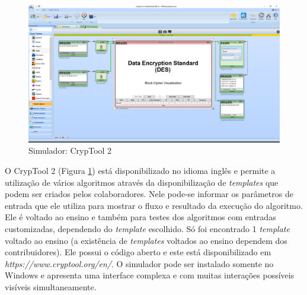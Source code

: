 \begin{figure}[H]
    \centering
    \caption{Simulador: CrypTool 2}
    \label{fig:cryptool2}
    \includegraphics[width=1\linewidth]{Simuladores/CrypTool2.png}
\end{figure}

O CrypTool 2 (Figura \ref{fig:cryptool2}) está disponibilizado no idioma inglês e permite a utilização de vários algoritmos através da disponibilização de \textit{templates} que podem ser criados pelos colaboradores. Nele pode-se informar os parâmetros de entrada que ele utiliza para mostrar o fluxo e resultado da execução do algoritmo. Ele é voltado ao ensino e também para testes dos algoritmos com entradas customizadas, dependendo do \textit{template} escolhido. Só foi encontrado 1 \textit{template} voltado ao ensino (a existência de \textit{templates} voltados ao ensino dependem dos contribuidores). Ele possui o código aberto e este está disponibilizado em \textit{https://www.cryptool.org/en/}. O simulador pode ser instalado somente no Windows e apresenta uma interface complexa e com muitas interações possíveis visíveis simultaneamente. \cite{cryptool14}



